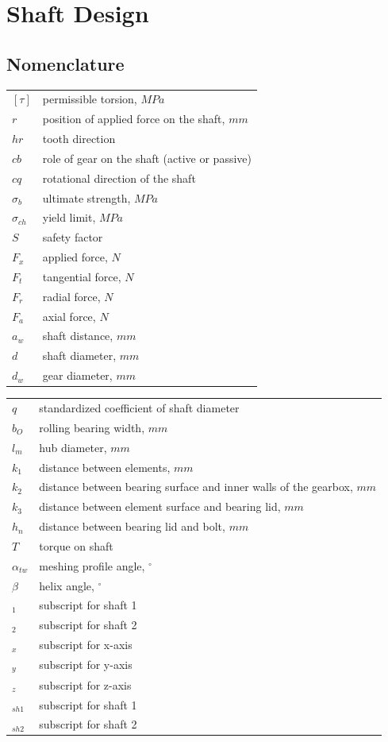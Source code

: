 \chapter{Shaft Design}
\section{Nomenclature}
\begin{tabular}[t]{lp{7cm}}
	$ [\tau] $ & permissible torsion, $ \unit{MPa} $\\
	$ r $ & position of applied force on the shaft, $\unit{mm}$\\
	$ hr $ & tooth direction\\
	$ cb $ & role of gear on the shaft (active or passive)\\
	$ cq $ & rotational direction of the shaft\\
	$ \sigma_b $ & ultimate strength, $ \unit{MPa} $\\
	$ \sigma_{ch} $ & yield limit, $ \unit{MPa} $\\
	$ S $ & safety factor\\
	$ F_x $ & applied force, $ \unit{N} $\\
	$ F_t $ & tangential force, $ \unit{N} $\\
	$ F_r $ & radial force, $ \unit{N} $\\
	$ F_a $ & axial force, $ \unit{N} $\\
	$ a_w $ & shaft distance, $ \unit{mm} $\\
	$ d $ & shaft diameter, $ \unit{mm} $\\
	$ d_w $ & gear diameter, $ \unit{mm} $\\
	
\end{tabular}
\begin{tabular}[t]{lp{7cm}}
	$ q $ & standardized coefficient of shaft diameter\\
	$ b_O $ & rolling bearing width, $ \unit{mm} $\\
	$ l_m $ & hub diameter, $ \unit{mm} $\\
	$ k_1 $ & distance between elements, $ \unit{mm} $\\
	$ k_2 $ & distance between bearing surface and inner walls of the gearbox, $ \unit{mm} $\\
	$ k_3 $ & distance between element surface and bearing lid, $ \unit{mm} $\\
	$ h_n $ & distance between bearing lid and bolt, $ \unit{mm} $\\
	$ T $ & torque on shaft\\
	$ \alpha_{tw} $ & meshing profile angle, $ ^\circ $\\
	$ \beta $ & helix angle, $ ^\circ $\\
	$ _1 $ & subscript for shaft 1\\
	$ _2 $ & subscript for shaft 2\\
	$ _x $ & subscript for x-axis\\
	$ _y $ & subscript for y-axis\\
	$ _z $ & subscript for z-axis\\
	$ _{sh1} $ & subscript for shaft 1\\
	$ _{sh2} $ & subscript for shaft 2\\
\end{tabular}
